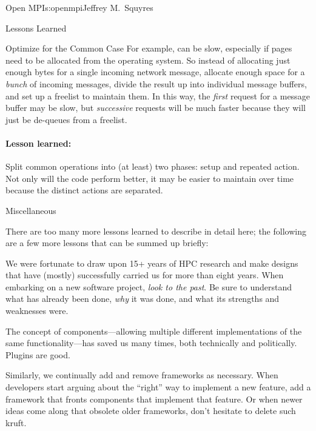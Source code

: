 \begin{aosachapter}{Open MPI}{s:openmpi}{Jeffrey M.\ Squyres}
\begin{aosasect1}{Lessons Learned}
\begin{aosasect2}{Optimize for the Common Case}
For example,  can be slow, especially if pages need to
be allocated from the operating system.  So instead of allocating just
enough bytes for a single incoming network message, allocate enough
space for a \emph{bunch} of incoming messages, divide the result up
into individual message buffers, and set up a freelist to maintain
them.  In this way, the \emph{first} request for a message buffer may
be slow, but \emph{successive} requests will be much faster because
they will just be de-queues from a freelist.


\paragraph{Lesson learned:} Split common operations into (at least)
two phases: setup and repeated action.  Not only will the code perform
better, it may be easier to maintain over time because the distinct
actions are separated.

\end{aosasect2}


\begin{aosasect2}{Miscellaneous}

There are too many more lessons learned to describe in detail here;
the following are a few more lessons that can be summed up briefly:

\begin{aosaitemize}
\item We were fortunate to draw upon 15+ years of HPC research and
  make designs that have (mostly) successfully carried us for more
  than eight years.  When embarking on a new software project,
  \emph{look to the past}.  Be sure to understand what has already
  been done, \emph{why} it was done, and what its strengths and
  weaknesses were.

\item The concept of components---allowing multiple different
  implementations of the same functionality---has saved us many
  times, both technically and politically.  Plugins are good.

\item Similarly, we continually add and remove frameworks as
  necessary.  When developers start arguing about the ``right'' way to
  implement a new feature, add a framework that fronts components that
  implement that feature.  Or when newer ideas come along that
  obsolete older frameworks, don't hesitate to delete such kruft.


\end{aosaitemize}
\end{aosasect2}
\end{aosasect1}
\end{aosachapter}
